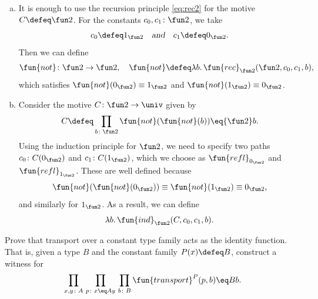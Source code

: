 \begin{solution}
    \begin{enumerate}[a)]
        \item It is enough to use the recursion principle \eqref{eq:rec2} for the motive $C\defeq\fun2$. For the constants $c_0,c_1\colon\fun2$, we take
        \[
            c_0\defeq1_{\fun2}
            \quad\textsl{and}\quad
            c_1\defeq0_{\fun2}.
        \]
        Then we can define
        \[
            \fun{not}\colon\fun2\to\fun2,
            \quad
            \fun{not}\defeq\lambda b.\,\fun{rec}_{\fun2}(\fun2,c_0,c_1,b),
        \]
        which satisfies $\fun{not}(0_{\fun2})\equiv1_{\fun2}$ and $\fun{not}(1_{\fun2})\equiv0_{\fun2}$.

        \item Consider the motive $C\colon\fun2\to\univ$ given by
        \[
            C\defeq\prod_{b\colon\fun2}\fun{not}(\fun{not}(b))\eq{\fun2}b.
        \]
        Using the induction principle for $\fun2$, we need to specify two paths $c_0\colon C(0_{\fun2})$ and $c_1\colon C(1_{\fun2})$, which we choose as $\fun{refl}_{0_{\fun2}}$ and $\fun{refl}_{1_{\fun2}}$. These are well defined because 
        \[
            \fun{not}(\fun{not}(0_{\fun2}))
                \equiv\fun{not}(1_{\fun2})
                \equiv0_{\fun2},
        \]
        and similarly for $1_{\fun2}$. As a result, we can define
        \[
            \lambda b.\,\fun{ind}_{\fun2}(C,c_0,c_1,b).
        \]
    \end{enumerate}
\end{solution}

\begin{exr}\label{exr:constant-fibration}
    Prove that transport over a constant type family acts as the identity function. That is, given a type\/ $B$ and the constant family\/ $P(x)\defeq B$, construct a witness for
    \[
        \prod_{x,y\colon A}\,
            \prod_{p\colon x\eq Ay}\,
            \prod_{b\colon B}\fun{transport}^P(p,b)\eq Bb.
    \]
\end{exr}

